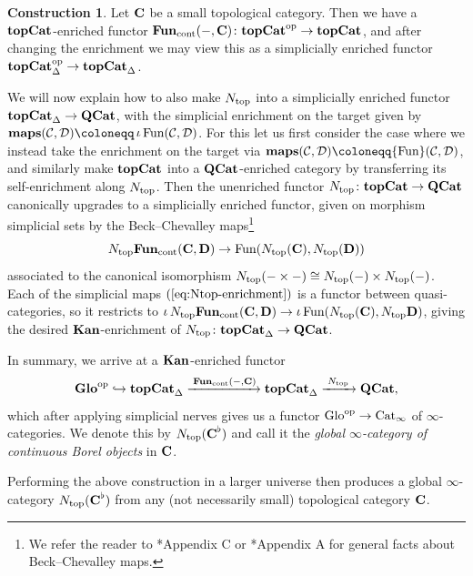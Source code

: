 \documentclass[reqno]{memo-l}
\theoremstyle{mythm}
\theoremstyle{definition}
\newtheorem{constr}[thm]{Construction}
\numberwithin{equation}{section}
\newcommand{\Cc}{{\mathcal{C}}}
\newcommand{\Dd}{{\mathcal{D}}}
\DeclareMathOperator{\Cat}{Cat}
\newcommand{\Fun}{{\textup{Fun}}}
\newcommand{\Ntop}{{N_\textup{top}}}
\newcommand{\cat}[1]{\textbf{\textup{#1}}}
\newcommand{\maps}{\cat{maps}}
\newcommand{\op}{{\textup{op}}}
\DeclareMathOperator{\core}{\iota}
\newcommand{\dual}{\flat}
\newcommand{\Glo}{\textup{Glo}}
\begin{document}
\begin{constr}\label{constr:continuous-Borel}
    Let $\cat{C}$ be a small topological category. Then we have a $\cat{topCat}$-enriched functor $\cat{Fun}_\text{cont}(-,\cat{C})\colon\cat{topCat}^\op\to\cat{topCat}$, and after changing the enrichment we may view this as a simplicially enriched functor $\cat{topCat}_\Delta^\op\to\cat{topCat}_\Delta$. 

    We will now explain how to also make $\Ntop$ into a simplicially enriched functor $\cat{topCat}_\Delta\to\cat{QCat}$, with the simplicial enrichment on the target given by $\maps(\Cc,\Dd)\coloneqq\core\Fun(\Cc,\Dd)$. For this let us first consider the case where we instead take the enrichment on the target via $\maps(\Cc,\Dd)\coloneqq\Fun(\Cc,\Dd)$, and similarly make $\cat{topCat}$ into a $\cat{QCat}$-enriched category by transferring its self-enrichment along $\Ntop$. Then the unenriched functor $\Ntop\colon\cat{topCat}\to\cat{QCat}$ canonically upgrades to a simplicially enriched functor, given on morphism simplicial sets by the Beck--Chevalley maps\footnote{We refer the reader to \cite{CLL_Adams}*{Appendix C} or \cite{CLL_Clefts}*{Appendix A} for general facts about Beck--Chevalley maps.} 
    \begin{equation}\label{eq:Ntop-enrichment}
        \Ntop\cat{Fun}_\text{cont}(\cat{C},\cat{D})\to\Fun(\Ntop(\cat{C}),\Ntop(\cat{D}))
    \end{equation}
    associated to the canonical isomorphism $\Ntop(-\times-)\cong\Ntop(-)\times\Ntop(-)$. Each of the simplicial maps $(\ref{eq:Ntop-enrichment})$ is a functor between quasi-categories, so it restricts to $\core\Ntop\cat{Fun}_\text{cont}(\cat{C},\cat{D})\to\core\Fun(\Ntop(\cat{C}),\Ntop{\cat{D}})$, giving the desired $\cat{Kan}$-enrichment of $\Ntop\colon\cat{topCat}_\Delta\to\cat{QCat}$.

    In summary, we arrive at a $\cat{Kan}$-enriched functor
    \[
        \cat{Glo}^\op\hookrightarrow\cat{topCat}_\Delta\xrightarrow{\;\cat{Fun}_\text{cont}(-,\cat{C})}\cat{topCat}_\Delta\xrightarrow{\;\Ntop\;}\cat{QCat},
    \]
    which after applying simplicial nerves gives us a functor $\Glo^\op\to\Cat_\infty$ of $\infty$-categories. We denote this by $\Ntop(\cat{C}^\dual)$ and call it the \emph{global $\infty$-category of continuous Borel objects} in $\cat{C}$.
\end{constr}

Performing the above construction in a larger universe then produces a global $\infty$-category $\Ntop(\cat{C}^\dual)$ from any (not necessarily small) topological category $\cat{C}$.
\end{document}
